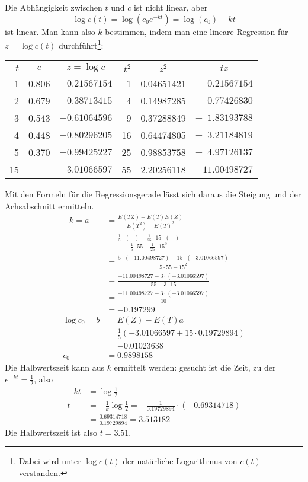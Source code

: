\begin{loesung}
Die Abhängigkeit zwischen $t$ und $c$ ist nicht linear, aber
\[
\log c(t)=\log(c_0e^{-kt})=\log(c_0)-kt
\]
ist linear. Man kann also $k$ bestimmen, indem man eine lineare
Regression für $z=\log c(t)$ durchführt\footnote{Dabei wird
unter $\log c(t)$ der natürliche Logarithmus von $c(t)$
verstanden.}:
\begin{center}
\begin{tabular}{rccrcc}
$t$&$c$&$z=\log c$&$t^2$&$z^2$&$tz$\\
\hline
1&0.806&$-0.21567154$& 1&0.04651421&$-\phantom{0}0.21567154$\\
2&0.679&$-0.38713415$& 4&0.14987285&$-\phantom{0}0.77426830$\\
3&0.543&$-0.61064596$& 9&0.37288849&$-\phantom{0}1.83193788$\\
4&0.448&$-0.80296205$&16&0.64474805&$-\phantom{0}3.21184819$\\
5&0.370&$-0.99425227$&25&0.98853758&$-\phantom{0}4.97126137$\\
\hline
15&    &$-3.01066597$&55&2.20256118&$-11.00498727$\\
\end{tabular}
\end{center}
Mit den Formeln für die Regressionsgerade lässt sich daraus
die Steigung und der Achsabschnitt ermitteln.
\begin{align*}
-k=a&=\frac{E(TZ)-E(T)E(Z)}{E(T^2)-E(T)^2}
\\
&=\frac{\frac15\cdot(-)-\frac1{25}\cdot 15\cdot(-)}{
\frac15\cdot 55-\frac1{25}\cdot 15^2
}
\\
&=\frac{5\cdot(-11.00498727)- 15\cdot(-3.01066597)}{
5\cdot 55- 15^2
}
\\
&=\frac{-11.00498727- 3\cdot(-3.01066597)}{
55- 3\cdot 15
}
\\
&=\frac{-11.00498727- 3\cdot(-3.01066597)}{
10
}
\\
&=-0.197299
\\
\log c_0=b&=E(Z)-E(T)a
\\
&=\frac15(
-3.01066597+15 \cdot 0.19729894
)
\\
&=-0.01023638
\\
c_0&=0.9898158
\end{align*}
Die Halbwertszeit kann aus $k$ ermittelt werden: gesucht ist
die Zeit, zu der $e^{-kt}=\frac12$, also
\begin{align*}
-kt&=\log\frac12
\\
t&=-\frac1k\log\frac12=
-\frac1{0.19729894}\cdot(-0.69314718)
\\
&=\frac{0.69314718}{0.19729894}
=3.513182
\end{align*}
Die Halbwertszeit ist also $t=3.51$.


\end{loesung}
